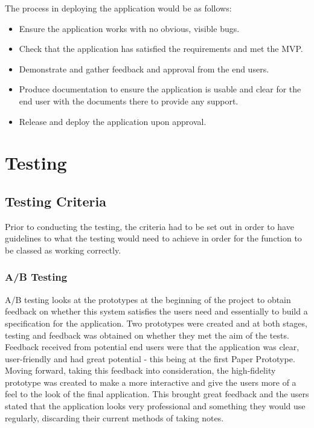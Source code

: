 \documentclass[oneside]{report}
\begin{document}
The process in deploying the application would be as follows:

\begin{itemize}
	\item Ensure the application works with no obvious, visible bugs.
	\item Check that the application has satisfied the requirements and met the MVP.
	\item Demonstrate and gather feedback and approval from the end users.
	\item Produce documentation to ensure the application is usable and clear for the end user with the documents there to provide any support.
	\item Release and deploy the application upon approval.
\end{itemize}

\chapter{Testing}
	\section{Testing Criteria}
	Prior to conducting the testing, the criteria had to be set out in order to have guidelines to what the testing would need to achieve in order for the function to be classed as working correctly. 
	
		\subsection{A/B Testing}
		A/B testing looks at the prototypes at the beginning of the project to obtain feedback on whether this system satisfies the users need and essentially to  build a specification for the application. Two prototypes were created and at both stages, testing and feedback was obtained on whether they met the aim of the tests.\\
		
Feedback received from potential end users were that the application was clear, user-friendly and had great potential - this being at the first Paper Prototype. Moving forward, taking this feedback into consideration, the high-fidelity prototype was created to make a more interactive and give the users more of a feel to the look of the final application. This brought great feedback and the users stated that the application looks very professional and something they would use regularly, discarding their current methods of taking notes.
	
\end{document}
